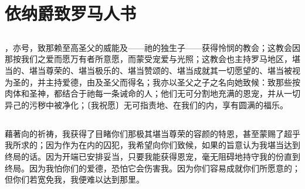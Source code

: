 
\chapter{依纳爵致罗马人书}



\section{}

，亦号，致那赖至高圣父的威能及——祂的独生子——获得怜悯的教会；这教会因那按我们之爱而愿万有者所意愿，而蒙受宠爱与光照；这教会也主持罗马地区，堪当的、堪当尊荣的、堪当极乐的、堪当赞颂的、堪当成就其一切愿望的、堪当被视为圣的，并主持爱德，由及圣父而得名；我亦以圣父之子之名向她致候：致那些按肉体和圣神，都结合于祂每一条诫命的人；他们无可分割地充满的恩宠，并从一切异己的污秽中被净化；〔我祝愿〕无可指责地、在我们的内，享有圆满的福乐。\par


\section{}

藉著向的祈祷，我获得了目睹你们那极其堪当尊荣的容颜的特恩，甚至蒙赐了超乎我所求的；因为作为在内的囚犯，我希望向你们致候，如果的旨意认为我堪当达到终局的话。因为开端已安排妥当，只要我能获得恩宠，毫无阻碍地持守我的份直到终局。因为我怕你们的爱德，恐怕它会伤害我。因为你们容易成就你们所愿意的；但你们若宽免我，我便难以达到那里。\par


\section{}

